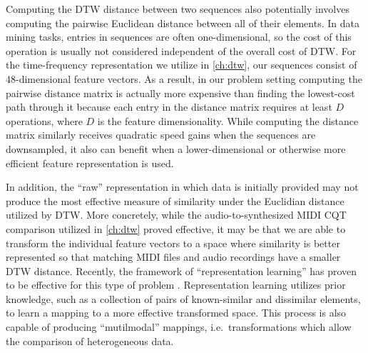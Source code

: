 Computing the DTW distance between two sequences also potentially involves computing the pairwise Euclidean distance between all of their elements.
In data mining tasks, entries in sequences are often one-dimensional, so the cost of this operation is usually not considered independent of the overall cost of DTW.
For the time-frequency representation we utilize in \cref{ch:dtw}, our sequences consist of 48-dimensional feature vectors.
As a result, in our problem setting computing the pairwise distance matrix is actually more expensive than finding the lowest-cost path through it because each entry in the distance matrix requires at least $D$ operations, where $D$ is the feature dimensionality.
While computing the distance matrix similarly receives quadratic speed gains when the sequences are downsampled, it also can benefit when a lower-dimensional or otherwise more efficient feature representation is used.

In addition, the ``raw'' representation in which data is initially provided may not produce the most effective measure of similarity under the Euclidian distance utilized by DTW.
More concretely, while the audio-to-synthesized MIDI CQT comparison utilized in \cref{ch:dtw} proved effective, it may be that we are able to transform the individual feature vectors to a space where similarity is better represented so that matching MIDI files and audio recordings have a smaller DTW distance.
Recently, the framework of ``representation learning'' has proven to be effective for this type of problem \cite{bengio2013representation}.
Representation learning utilizes prior knowledge, such as a collection of pairs of known-similar and dissimilar elements, to learn a mapping to a more effective transformed space.
This process is also capable of producing ``mutilmodal'' mappings, i.e.\ transformations which allow the comparison of heterogeneous data.


